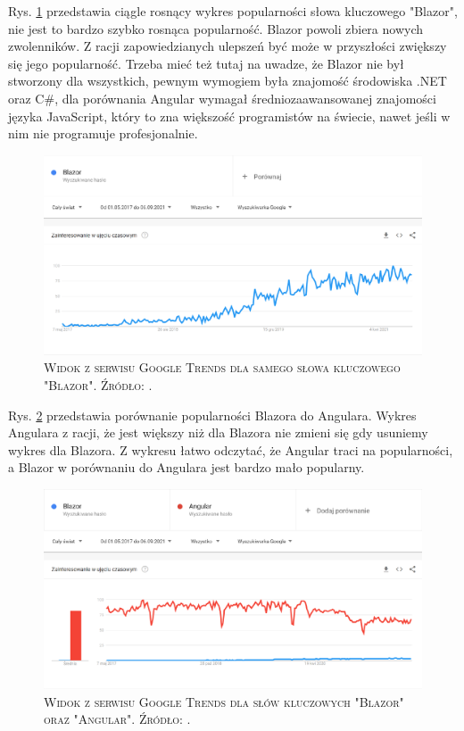 \documentclass[12pt,a4paper,oneside]{book}
\newcommand{\captionT}[1]{\caption{\textsc{\footnotesize{#1}}}}
\begin{document}
Rys. \ref{rys_google_trends_blazor} przedstawia ciągle rosnący wykres popularności słowa kluczowego "Blazor", nie jest to bardzo szybko rosnąca popularność. Blazor powoli zbiera nowych zwolenników. Z racji zapowiedzianych ulepszeń być może w przyszłości zwiększy się jego popularność. Trzeba mieć też tutaj na uwadze, że Blazor nie był stworzony dla wszystkich, pewnym wymogiem była znajomość środowiska .NET oraz C\#, dla porównania Angular wymagał średniozaawansowanej znajomości języka JavaScript, który to zna większość programistów na świecie, nawet jeśli w nim nie programuje profesjonalnie.

\begin{figure}[H]
\centering
\includegraphics[width=1\textwidth]{images/GoogleTrendsBlazor.pdf}
\captionT{Widok z serwisu Google Trends dla samego słowa kluczowego "Blazor". Źródło: \cite{STACKOVERFLOW_TRENDS_BLAZOR}.}
\label{rys_google_trends_blazor}
\end{figure}

Rys. \ref{rys_google_trends_blazor_angular} przedstawia porównanie popularności Blazora do Angulara. Wykres Angulara z racji, że jest większy niż dla Blazora nie zmieni się gdy usuniemy wykres dla Blazora. Z wykresu łatwo odczytać, że Angular traci na popularności, a Blazor w porównaniu do Angulara jest bardzo mało popularny.

\begin{figure}[H]
\centering
\includegraphics[width=1\textwidth]{images/GoogleTrendsBlazorAngular.pdf}
\captionT{Widok z serwisu Google Trends dla słów kluczowych "Blazor" oraz "Angular". Źródło: \cite{GOOGLE_TRENDS_BLAZOR_ANGULAR}.}
\label{rys_google_trends_blazor_angular}
\end{figure}
\end{document}
